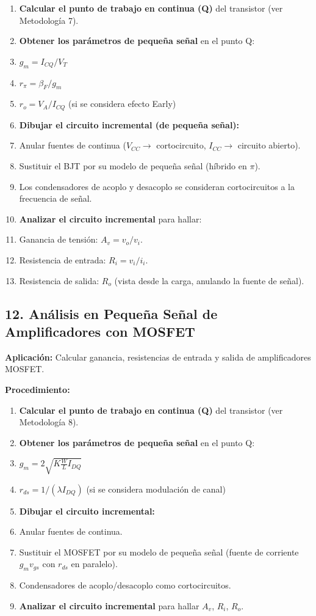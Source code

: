 \documentclass[11pt,a4paper]{article}
\begin{document}
\begin{enumerate}[leftmargin=*,topsep=2pt,itemsep=1pt]
  \item \textbf{Calcular el punto de trabajo en continua (Q)} del transistor (ver Metodología 7).
  \item \textbf{Obtener los parámetros de pequeña señal} en el punto Q:
  \item $g_m = I_{CQ} / V_T$
  \item $r_\pi = \beta_F / g_m$
  \item $r_o = V_A / I_{CQ}$ (si se considera efecto Early)
  \item \textbf{Dibujar el circuito incremental (de pequeña señal):}
  \item Anular fuentes de continua ($V_{CC} \to$ cortocircuito, $I_{CC} \to$ circuito abierto).
  \item Sustituir el BJT por su modelo de pequeña señal (híbrido en $\pi$).
  \item Los condensadores de acoplo y desacoplo se consideran cortocircuitos a la frecuencia de señal.
  \item \textbf{Analizar el circuito incremental} para hallar:
  \item Ganancia de tensión: $A_v = v_o / v_i$.
  \item Resistencia de entrada: $R_i = v_i / i_i$.
  \item Resistencia de salida: $R_o$ (vista desde la carga, anulando la fuente de señal).
\end{enumerate}


\subsection*{12. Análisis en Pequeña Señal de Amplificadores con MOSFET}


\textbf{Aplicación:} Calcular ganancia, resistencias de entrada y salida de amplificadores MOSFET.


\textbf{Procedimiento:}


\begin{enumerate}[leftmargin=*,topsep=2pt,itemsep=1pt]
  \item \textbf{Calcular el punto de trabajo en continua (Q)} del transistor (ver Metodología 8).
  \item \textbf{Obtener los parámetros de pequeña señal} en el punto Q:
  \item $g_m = 2 \sqrt{K \frac{W}{L} I_{DQ}}$
  \item $r_{ds} = 1 / (\lambda I_{DQ})$ (si se considera modulación de canal)
  \item \textbf{Dibujar el circuito incremental:}
  \item Anular fuentes de continua.
  \item Sustituir el MOSFET por su modelo de pequeña señal (fuente de corriente $g_m v_{gs}$ con $r_{ds}$ en paralelo).
  \item Condensadores de acoplo/desacoplo como cortocircuitos.
  \item \textbf{Analizar el circuito incremental} para hallar $A_v$, $R_i$, $R_o$.
\end{enumerate}
\end{document}
